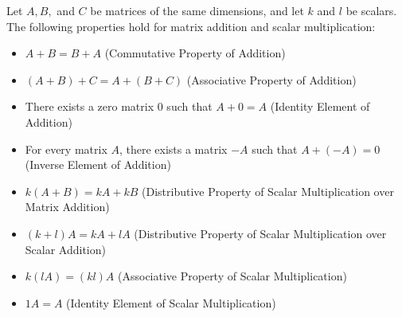 \begin{theorem}
    Let \( A, B, \) and \( C \) be matrices of the same dimensions, and let \( k \) and \( l \) be scalars. The following properties hold for matrix addition and scalar multiplication:
    \begin{itemize}[itemsep=1pt,label=$\circ$]
        \item \( A + B = B + A \) (Commutative Property of Addition)
        \item \( (A + B) + C = A + (B + C) \) (Associative Property of Addition)
        \item There exists a zero matrix \( 0 \) such that \( A + 0 = A \) (Identity Element of Addition)
        \item For every matrix \( A \), there exists a matrix \( -A \) such that \( A + (-A) = 0 \) (Inverse Element of Addition)
        \item \( k(A + B) = kA + kB \) (Distributive Property of Scalar Multiplication over Matrix Addition)
        \item \( (k + l)A = kA + lA \) (Distributive Property of Scalar Multiplication over Scalar Addition)
        \item \( k(lA) = (kl)A \) (Associative Property of Scalar Multiplication)
        \item \( 1A = A \) (Identity Element of Scalar Multiplication)
    \end{itemize}
\end{theorem}

